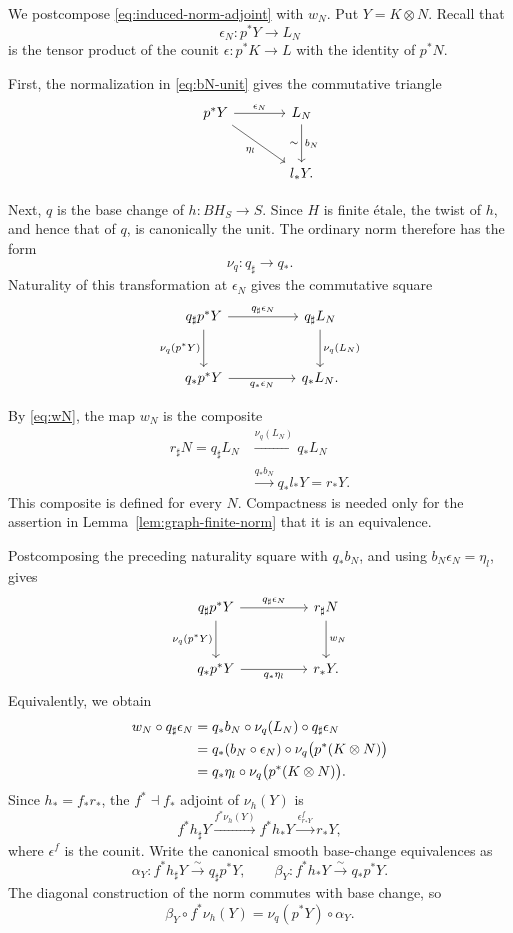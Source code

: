\documentclass[11pt,reqno]{amsart}
\theoremstyle{definition}
\theoremstyle{remark}
\theoremstyle{plain}
\numberwithin{equation}{section}
\begin{document}
We postcompose \eqref{eq:induced-norm-adjoint} with \(w_N\).
Put \(Y=K\otimes N\). Recall that
\[
 \epsilon_N:
 p^*Y\longrightarrow L_N
\]
is the tensor product of the counit
\(\epsilon:p^*K\to L\) with the identity of \(p^*N\).

First, the normalization in \eqref{eq:bN-unit} gives the
commutative triangle
\[
\begin{tikzcd}[column sep=large,row sep=large]
 p^*Y
   \arrow[r,"\epsilon_N"]
   \arrow[dr,"\eta_l"']
 &
 L_N
   \arrow[d,"b_N","\sim"']
 \\
 & l_*Y .
\end{tikzcd}
\]

Next, \(q\) is the base change of \(h:BH_S\to S\).
Since \(H\) is finite étale, the twist of \(h\), and hence
that of \(q\), is canonically the unit.
The ordinary norm therefore has the form
\[
 \nu_q:q_\sharp\longrightarrow q_*.
\]
Naturality of this transformation at \(\epsilon_N\)
gives the commutative square
\[
\begin{tikzcd}[column sep=huge,row sep=large]
 q_\sharp p^*Y
   \arrow[r,"q_\sharp\epsilon_N"]
   \arrow[d,"\nu_q(p^*Y)"']
 &
 q_\sharp L_N
   \arrow[d,"\nu_q(L_N)"]
 \\
 q_*p^*Y
   \arrow[r,"q_*\epsilon_N"']
 &
 q_*L_N .
\end{tikzcd}
\]

By \eqref{eq:wN}, the map \(w_N\) is the composite
\[
\begin{aligned}
 r_\sharp N=q_\sharp L_N
 &\xrightarrow{\nu_q(L_N)}q_*L_N\\
 &\xrightarrow{q_*b_N}q_*l_*Y=r_*Y.
\end{aligned}
\]
This composite is defined for every \(N\).
Compactness is needed only for the assertion in
Lemma~\ref{lem:graph-finite-norm} that it is an equivalence.

Postcomposing the preceding naturality square with
\(q_*b_N\), and using \(b_N\epsilon_N=\eta_l\), gives
\[
\begin{tikzcd}[column sep=huge,row sep=large]
 q_\sharp p^*Y
   \arrow[r,"q_\sharp\epsilon_N"]
   \arrow[d,"\nu_q(p^*Y)"']
 &
 r_\sharp N
   \arrow[d,"w_N"]
 \\
 q_*p^*Y
   \arrow[r,"q_*\eta_l"']
 &
 r_*Y .
\end{tikzcd}
\]
Equivalently, we obtain
\begin{align}
 w_N\circ q_\sharp\epsilon_N
 &=q_*b_N\circ\nu_q(L_N)\circ q_\sharp\epsilon_N
   \notag\\
 &=q_*(b_N\circ\epsilon_N)\circ
       \nu_q\bigl(p^*(K\otimes N)\bigr)
   \notag\\
 &=q_*\eta_l\circ
       \nu_q\bigl(p^*(K\otimes N)\bigr).
 \label{eq:norm-pasting}
\end{align}
Since \(h_*=f_*r_*\), the
\(f^*\dashv f_*\) adjoint of \(\nu_h(Y)\) is
\[
 f^*h_\sharp Y
 \xrightarrow{f^*\nu_h(Y)}f^*h_*Y
 \xrightarrow{\epsilon^f_{r_*Y}}r_*Y,
\]
where \(\epsilon^f\) is the counit.
Write the canonical smooth base-change equivalences as
\[
 \alpha_Y:f^*h_\sharp Y\xrightarrow{\sim}q_\sharp p^*Y,
 \qquad
 \beta_Y:f^*h_*Y\xrightarrow{\sim}q_*p^*Y.
\]
The diagonal construction of the norm commutes with base change, so
\[
 \beta_Y\circ f^*\nu_h(Y)
 =\nu_q(p^*Y)\circ\alpha_Y.
\]
\end{document}
